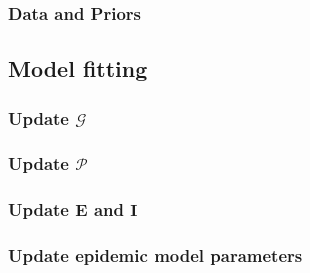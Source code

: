 \documentclass[11pt, notitlepage]{article}%
\numberwithin{equation}{section}
\begin{document}
\subsubsection{Data and Priors}

\subsection{Model fitting}

\subsubsection{Update $\mathscr{G}$}

\subsubsection{Update $\mathscr{P}$}

\subsubsection{Update $\mathbf{E}$ and $\mathbf{I}$}

\subsubsection{Update epidemic model parameters}


%

\end{document}
